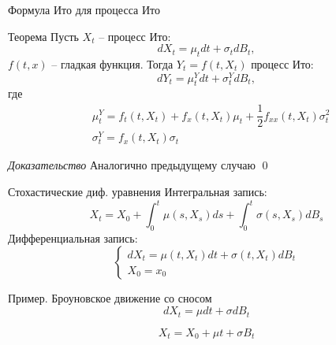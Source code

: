 \documentclass[aspectratio=169]{beamer}
\begin{document}
\begin{frame}{Формула Ито для процесса Ито}
    \begin{block}{Теорема}
    Пусть $X_t$ -- процесс Ито:
    $$
        dX_t = \mu_t dt + \sigma_t dB_t,
    $$ $f(t, x)$ -- гладкая функция. Тогда $Y_t = f(t, X_t)$ процесс Ито:
    $$
        dY_t = \mu^Y_t dt + \sigma^Y_t dB_t,
    $$где 
    \begin{align*}
        &\mu^Y_t = f_t(t, X_t) + f_x(t, X_t) \mu_t + \dfrac{1}{2} f_{xx}(t, X_t) \sigma_t^2 \\
        &\sigma_t^Y = f_x(t, X_t) \sigma_t 
    \end{align*}
     \end{block}
    \textit{Доказательство} Аналогично предыдущему случаю \qed
\end{frame}

\begin{frame}{Стохастические диф. уравнения}
    Интегральная запись:
    $$
        X_t = X_0 + \int_0^t \mu(s, X_s) ds + \int_0^t \sigma(s, X_s) dB_s
    $$
    Дифференциальная запись:
    $$
        \begin{cases}
            d X_t = \mu(t, X_t) dt + \sigma(t, X_t) dB_t \\
            X_0 = x_0
        \end{cases}
    $$
\end{frame}

\begin{frame}{Пример. Броуновское движение со сносом}
    $$
        dX_t = \mu dt + \sigma dB_t 
    $$
     
    $$
        X_t = X_0 + \mu t + \sigma B_t
    $$
\end{frame}
\end{document}
